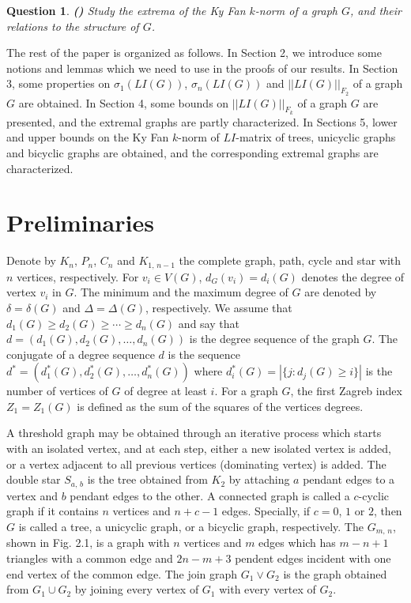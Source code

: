 \documentclass[12pt, a4paper]{article}
\newtheorem{question}[theorem]{Question}
\begin{document}
\begin{question}{\bf (\cite{N})}
Study the extrema of the Ky Fan $k$-norm of a graph $G$, and their relations to the structure of $G$.
\end{question}


The rest of the paper is organized as follows. In Section 2, we introduce some notions and lemmas which we need to use in the proofs of our results. In Section 3, some properties on $\sigma_1(LI(G))$, $\sigma_n(LI(G))$ and $||LI(G)||_{F_2}$ of a graph $G$ are obtained. In Section 4, some bounds on $||LI(G)||_{F_k}$ of a graph $G$ are presented, and the extremal graphs are partly characterized. In Sections 5, lower and upper bounds on the Ky Fan $k$-norm of $LI$-matrix of trees, unicyclic graphs and bicyclic graphs are obtained, and the corresponding extremal graphs are characterized.


\section{\large  Preliminaries}

Denote by $K_n$, $P_n$, $C_n$ and $K_{1,\, n-1}$ the complete graph, path, cycle and star with $n$ vertices, respectively. For $v_i\in V(G)$, $d_G(v_i)=d_i(G)$ denotes the degree of vertex $v_i$ in $G$. The minimum and the maximum degree of $G$ are denoted by $\delta=\delta(G)$ and $\Delta=\Delta(G)$, respectively. We assume that $d_1(G)\geq d_2(G)\geq \cdots \geq d_n(G)$ and say that $d=(d_1(G), d_2(G), \ldots, d_n(G))$ is the degree sequence of the graph $G$. The conjugate of a degree sequence $d$ is the sequence $d^{*}=(d_1^*(G), d_2^*(G), \ldots, d_n^*(G))$ where $d_i^*(G)=|\{j: d_j(G)\geq i\}|$ is the number of vertices
of $G$ of degree at least $i$. For a graph $G$, the first Zagreb index $Z_1=Z_1(G)$ is defined as the sum of the squares of the vertices degrees.

A threshold graph may be obtained through an iterative process which starts with an isolated vertex, and at each step, either a new isolated vertex is added, or a vertex
adjacent to all previous vertices (dominating vertex) is added. The double star $S_{a,\, b}$ is the tree obtained from $K_2$ by attaching $a$ pendant edges to a vertex and $b$ pendant edges to the other. A connected graph is called a $c$-cyclic graph if it contains $n$ vertices and $n+c-1$ edges. Specially, if $c=0$, $1$ or $2$, then $G$ is called a tree, a unicyclic graph, or a bicyclic graph, respectively. The $G_{m,\,n}$, shown in Fig. 2.1, is a graph with $n$ vertices and $m$ edges which has $m-n+1$ triangles with a common edge and $2n-m+3$ pendent edges incident with one end vertex of the common edge. The join graph $G_1\vee G_2$ is the graph obtained from $G_1\cup G_2$ by joining every vertex of $G_1$ with every vertex of $G_2$.
\end{document}
